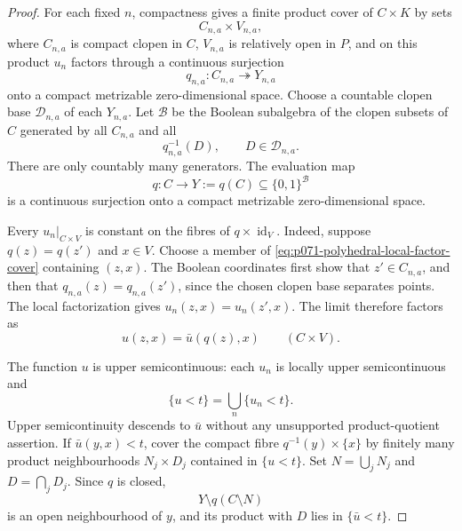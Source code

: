 \begin{proof}
For each fixed \(n\), compactness gives a finite product cover of
\(C\times K\) by sets
\begin{equation}
                           C_{n,a}\times V_{n,a},
 \label{eq:p071-polyhedral-local-factor-cover}
\end{equation}
where \(C_{n,a}\) is compact clopen in \(C\), \(V_{n,a}\) is relatively
open in \(P\), and on this product \(u_n\) factors through a continuous
surjection
\[
                  q_{n,a}:C_{n,a}\twoheadrightarrow Y_{n,a}
\]
onto a compact metrizable zero-dimensional space.  Choose a countable
clopen base \(\mathcal D_{n,a}\) of each \(Y_{n,a}\).  Let
\(\mathcal B\) be the Boolean subalgebra of the clopen subsets of \(C\)
generated by all \(C_{n,a}\) and all
\[
                     q_{n,a}^{-1}(D),
                     \qquad D\in\mathcal D_{n,a}.
\]
There are only countably many generators.  The evaluation map
\begin{equation}
 q:C\longrightarrow
 Y:=q(C)\subseteq\{0,1\}^{\mathcal B}
 \label{eq:p071-polyhedral-common-quotient}
\end{equation}
is a continuous surjection onto a compact metrizable zero-dimensional
space.

Every \(u_n|_{C\times V}\) is constant on the fibres of
\(q\times\operatorname{id}_V\).  Indeed, suppose \(q(z)=q(z')\) and
\(x\in V\).  Choose a member of
\eqref{eq:p071-polyhedral-local-factor-cover} containing \((z,x)\).
The Boolean coordinates first show that \(z'\in C_{n,a}\), and then that
\(q_{n,a}(z)=q_{n,a}(z')\), since the chosen clopen base separates points.
The local factorization gives \(u_n(z,x)=u_n(z',x)\).  The limit therefore
factors as
\begin{equation}
                           u(z,x)=\bar u(q(z),x)
                           \qquad(C\times V).
 \label{eq:p071-polyhedral-limit-factor}
\end{equation}

The function \(u\) is upper semicontinuous: each \(u_n\) is locally upper
semicontinuous and
\[
                         \{u<t\}=\bigcup_n\{u_n<t\}.
\]
Upper semicontinuity descends to \(\bar u\) without any unsupported
product-quotient assertion.  If \(\bar u(y,x)<t\), cover the compact fibre
\(q^{-1}(y)\times\{x\}\) by finitely many product neighbourhoods
\(N_j\times D_j\) contained in \(\{u<t\}\).  Set
\(N=\bigcup_jN_j\) and \(D=\bigcap_jD_j\).  Since \(q\) is closed,
\[
                         Y\setminus q(C\setminus N)
\]
is an open neighbourhood of \(y\), and its product with \(D\) lies in
\(\{\bar u<t\}\).


\end{proof}
